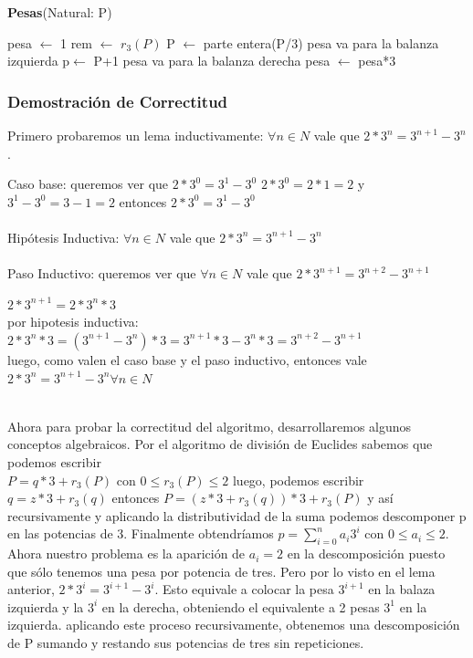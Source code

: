 \documentclass[spanish,12pt]{article}
\begin{document}
\begin{algorithm}[H]{\textbf{Pesas}(Natural: P)}
	\begin{algorithmic}[1]
		\State pesa $\gets$ 1
		 	\State rem $\gets$ $r_3 (P)$
	    		\State P $\gets $ parte entera(P/3)
	    			\State pesa va para la balanza izquierda    			\Else
	    				\State p$\gets$ P+1
	    				\State pesa va para la balanza derecha
				\EndIf
			\EndIf
			\State pesa $\gets$ pesa*3
		\endWhile
	\end{algorithmic}
\end{algorithm}



\subsubsection{Demostración de Correctitud}

Primero probaremos un lema inductivamente:
$\forall n \in N$ vale que  $2*3^{n} = 3^{n+1}-3^{n}$.

Caso base:
queremos ver que $2*3^{0} = 3^{1}-3^{0}$
$2*3^0 = 2*1=2$ y $3^1-3^0= 3-1=2$ entonces $2*3^{0} = 3^{1}-3^{0}$
\\
\\
Hipótesis Inductiva:
$\forall n \in N$ vale que  $2*3^{n} = 3^{n+1}-3^{n}$
\\
\\
Paso Inductivo:
queremos ver que $\forall n \in N$ vale que  $2*3^{n+1} = 3^{n+2}-3^{n+1}$

$2*3^{n+1} = 2*3^{n}*3 $
\\
 por hipotesis inductiva: $2*3^{n}*3 = (3^{n+1}-3^{n})*3 = 3^{n+1}*3 - 3^{n}*3= 3^{n+2}-3^{n+1} $
\\
luego, como valen el caso base y el paso inductivo, entonces vale $2*3^{n} = 3^{n+1}-3^{n} \forall n \in N $

\\
Ahora para probar la correctitud del algoritmo, desarrollaremos algunos conceptos algebraicos.
Por el algoritmo de división de Euclides sabemos que podemos escribir \\  $P= q*3+ r_{3}(P)$ con $0\leq r_{3}(P) \leq 2 $ luego, podemos escribir $q= z*3 + r_{3}(q)$ entonces $P= (z*3 + r_{3}(q))*3 +r_{3}(P)$ y así recursivamente y aplicando la distributividad de la suma podemos descomponer p en las potencias de 3. Finalmente obtendríamos $p= \sum_{i=0}^{n}{a_i 3^{i}} $ con $0 \leq a_i \leq 2$.
Ahora nuestro problema es la aparición de $a_i=2$ en la descomposición puesto que sólo tenemos una pesa por potencia de tres. Pero por lo visto en el lema anterior, $2*3^{i}= 3^{i+1}-3^{i}$. Esto equivale a colocar la pesa $3^{i+1}$ en la balaza izquierda y la $3^{i}$ en la derecha, obteniendo el equivalente a 2 pesas $3^{1}$ en la izquierda. aplicando este proceso recursivamente, obtenemos  una descomposición de P sumando y restando sus potencias de tres sin repeticiones.
\end{document}
